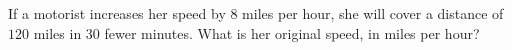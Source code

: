 If a motorist increases her speed by $8$ miles per hour, she will cover a distance of $120$ miles in $30$ fewer minutes. What is her original speed, in miles per hour?
